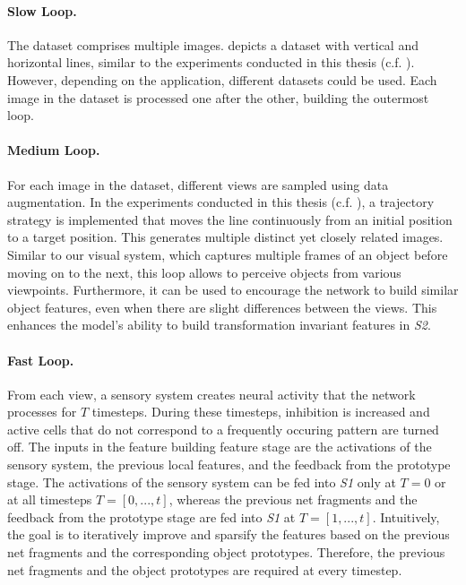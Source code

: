 \paragraph{Slow Loop.} The dataset comprises multiple images.  depicts a dataset with vertical and horizontal lines, similar to the experiments conducted in this thesis (c.f. ). However, depending on the application, different datasets could be used. Each image in the dataset is processed one after the other, building the outermost loop.

\paragraph{Medium Loop.} For each image in the dataset, different views are sampled using data augmentation. In the experiments conducted in this thesis (c.f. ), a trajectory strategy is implemented that moves the line continuously from an initial position to a target position. This generates multiple distinct yet closely related images. Similar to our visual system, which captures multiple frames of an object before moving on to the next, this loop allows to perceive objects from various viewpoints. Furthermore, it can be used to encourage the network to build similar object features, even when there are slight differences between the views. This enhances the model's ability to build transformation invariant features in \emph{S2}.

\paragraph{Fast Loop.} From each view, a sensory system creates neural activity that the network processes for $T$ timesteps. During these timesteps, inhibition is increased and active cells that do not correspond to a frequently occuring pattern are turned off. The inputs in the feature building feature stage are the activations of the sensory system, the previous local features, and the feedback from the prototype stage.
The activations of the sensory system can be fed into \emph{S1} only at $T=0$ or at all timesteps $T=[0, ..., t]$, whereas the previous net fragments and the feedback from the prototype stage are fed into \emph{S1} at $T=[1, ..., t]$. Intuitively, the goal is to iteratively improve and sparsify the features based on the previous net fragments and the corresponding object prototypes. Therefore, the previous net fragments and the object prototypes are required at every timestep.


